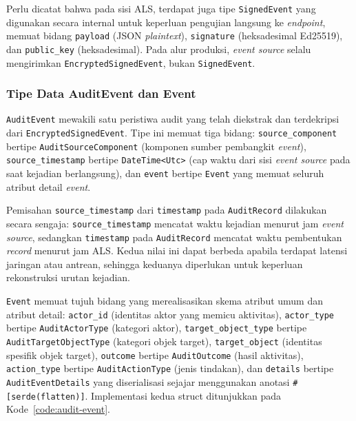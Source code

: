 Perlu dicatat bahwa pada sisi ALS, terdapat juga tipe \texttt{SignedEvent}
yang digunakan secara internal untuk keperluan pengujian langsung ke
\textit{endpoint}, memuat bidang \texttt{payload} (JSON \textit{plaintext}),
\texttt{signature} (heksadesimal Ed25519), dan \texttt{public\_key}
(heksadesimal). Pada alur produksi, \textit{event source} selalu mengirimkan
\texttt{EncryptedSignedEvent}, bukan \texttt{SignedEvent}.

\subsubsection{Tipe Data AuditEvent dan Event}

\texttt{AuditEvent} mewakili satu peristiwa audit yang telah diekstrak dan
terdekripsi dari \texttt{EncryptedSignedEvent}. Tipe ini memuat tiga bidang:
\texttt{source\_component} bertipe \texttt{AuditSourceComponent} (komponen
sumber pembangkit \textit{event}), \texttt{source\_timestamp} bertipe
\texttt{DateTime<Utc>} (cap waktu dari sisi \textit{event source} pada saat
kejadian berlangsung), dan \texttt{event} bertipe \texttt{Event} yang memuat
seluruh atribut detail \textit{event}.

Pemisahan \texttt{source\_timestamp} dari \texttt{timestamp} pada
\texttt{AuditRecord} dilakukan secara sengaja: \texttt{source\_timestamp}
mencatat waktu kejadian menurut jam \textit{event source}, sedangkan
\texttt{timestamp} pada \texttt{AuditRecord} mencatat waktu pembentukan
\textit{record} menurut jam ALS. Kedua nilai ini dapat berbeda apabila terdapat
latensi jaringan atau antrean, sehingga keduanya diperlukan untuk keperluan
rekonstruksi urutan kejadian.

\texttt{Event} memuat tujuh bidang yang merealisasikan skema atribut umum dan
atribut detail: \texttt{actor\_id} (identitas aktor yang memicu aktivitas),
\texttt{actor\_type} bertipe \texttt{AuditActorType} (kategori aktor),
\texttt{target\_object\_type} bertipe \texttt{AuditTargetObjectType} (kategori
objek target), \texttt{target\_object} (identitas spesifik objek target),
\texttt{outcome} bertipe \texttt{AuditOutcome} (hasil aktivitas),
\texttt{action\_type} bertipe \texttt{AuditActionType} (jenis tindakan), dan
\texttt{details} bertipe \texttt{AuditEventDetails} yang diserialisasi sejajar
menggunakan anotasi \texttt{\#[serde(flatten)]}. Implementasi kedua struct
ditunjukkan pada Kode~\ref{code:audit-event}.

